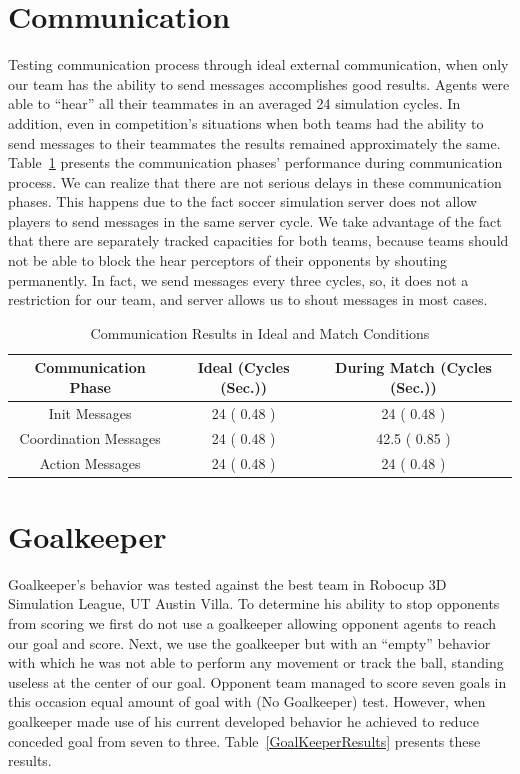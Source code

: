 \section{Communication}
Testing communication process through ideal external communication, when only our team has the ability to send messages accomplishes good results. Agents were able to ``hear'' all their teammates in an averaged 24 simulation cycles. In addition, even in competition's situations when both teams had the ability to send messages to their teammates the results remained approximately the same. Table~\ref{CommunicationResults} presents the communication phases' performance during communication process. We can realize that there are not serious delays in these communication phases. This happens due to the fact soccer simulation server does not allow players to send messages in the same server cycle. We take advantage of the fact that there are separately tracked capacities for both teams, because teams should not be able to block the hear perceptors of their opponents by shouting permanently. In fact, we send  messages every three cycles, so, it does not a restriction for our team, and server allows us to shout messages in most cases.

\begin{table}[h!]
\begin{center}
\begin{footnotesize}
    \begin{tabular}{ccc}
    \textbf{Communication Phase} 	& \textbf{Ideal (Cycles (Sec.))}			& \textbf{During Match (Cycles (Sec.))} \\
    \midrule
    Init Messages 					& 24  ( 0.48 ) 			& 24 	( 0.48 )		\\
    Coordination Messages			& 24  ( 0.48 )			& 42.5  ( 0.85 )		\\
    Action Messages 				    & 24  ( 0.48 )			& 24 ( 0.48 )	 		\\
    \end{tabular}
    \end{footnotesize}
\end{center}
\label{CommunicationResults}
\caption{Communication Results in Ideal and Match Conditions}
\end{table}



\section{Goalkeeper}
Goalkeeper's behavior was tested against the best team in Robocup 3D Simulation League, UT Austin Villa. To determine his ability to stop opponents from scoring we first do not use a goalkeeper allowing opponent agents to reach our goal and score. Next, we use the goalkeeper but with an ``empty'' behavior with which he was not able to perform any movement or track the ball, standing useless at the center of our goal. Opponent team managed to score seven goals in this occasion equal amount of goal with (No Goalkeeper) test. However, when goalkeeper made use of his current developed behavior he achieved to reduce conceded goal from seven to three. Table~\ref{GoalKeeperResults} presents these results.



